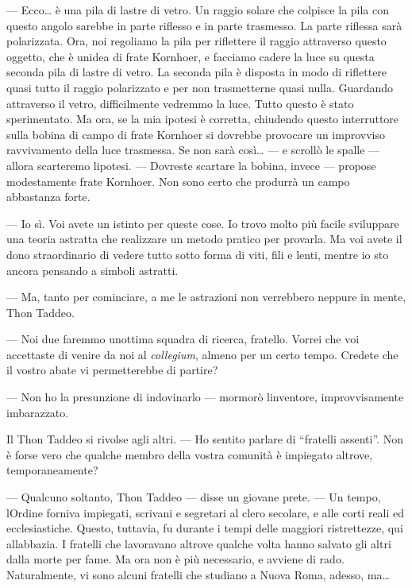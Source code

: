 --- Ecco\ldots{} è una pila di lastre di vetro. Un raggio solare che
colpisce la pila con questo angolo sarebbe in parte riflesso e in parte
trasmesso. La parte riflessa sarà polarizzata. Ora, noi regoliamo la
pila per riflettere il raggio attraverso questo oggetto, che è
un\textquotesingle idea di frate Kornhoer, e facciamo cadere la luce su
questa seconda pila di lastre di vetro. La seconda pila è disposta in
modo di riflettere quasi tutto il raggio polarizzato e per non
trasmetterne quasi nulla. Guardando attraverso il vetro, difficilmente
vedremmo la luce. Tutto questo è stato sperimentato. Ma ora, se la mia
ipotesi è corretta, chiudendo questo interruttore sulla bobina di campo
di frate Kornhoer si dovrebbe provocare un improvviso ravvivamento della
luce trasmessa. Se non sarà così\ldots{} --- e scrollò le spalle ---
allora scarteremo l\textquotesingle ipotesi. --- Dovreste scartare la
bobina, invece --- propose modestamente frate Kornhoer. Non sono certo
che produrrà un campo abbastanza forte.

--- Io sì. Voi avete un istinto per queste cose. Io trovo molto più
facile sviluppare una teoria astratta che realizzare un metodo pratico
per provarla. Ma voi avete il dono straordinario di vedere tutto sotto
forma di viti, fili e lenti, mentre io sto ancora pensando a simboli
astratti.

--- Ma, tanto per cominciare, a me le astrazioni non verrebbero neppure
in mente, Thon Taddeo.

--- Noi due faremmo un\textquotesingle ottima squadra di ricerca,
fratello. Vorrei che voi accettaste di venire da noi al
\emph{collegium}, almeno per un certo tempo. Credete che il vostro abate
vi permetterebbe di partire?

--- Non ho la presunzione di indovinarlo --- mormorò
l\textquotesingle inventore, improvvisamente imbarazzato.

Il Thon Taddeo si rivolse agli altri. --- Ho sentito parlare di
``fratelli assenti''. Non è forse vero che qualche membro della vostra
comunità è impiegato altrove, temporaneamente?

--- Qualcuno soltanto, Thon Taddeo --- disse un giovane prete. --- Un
tempo, l\textquotesingle Ordine forniva impiegati, scrivani e segretari
al clero secolare, e alle corti reali ed ecclesiastiche. Questo,
tuttavia, fu durante i tempi delle maggiori ristrettezze, qui
all\textquotesingle abbazia. I fratelli che lavoravano altrove qualche
volta hanno salvato gli altri dalla morte per fame. Ma ora non è più
necessario, e avviene di rado. Naturalmente, vi sono alcuni fratelli che
studiano a Nuova Roma, adesso, ma\ldots{}

